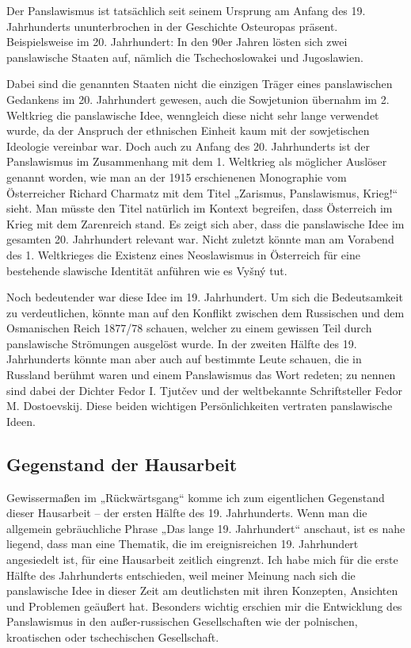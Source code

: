 \documentclass[12pt,headsepline,a4paper]{scrartcl}
\begin{document}
Der Panslawismus ist tatsächlich seit seinem Ursprung am Anfang des 19. Jahrhunderts
ununterbrochen in der Geschichte Osteuropas präsent. Beispielsweise im 20. Jahrhundert:
In den 90er Jahren lösten sich zwei panslawische Staaten auf, nämlich die Tschechoslowakei
und Jugoslawien.

Dabei sind die genannten Staaten nicht die einzigen Träger eines panslawischen Gedankens
im 20. Jahrhundert gewesen, auch die Sowjetunion übernahm im 2. Weltkrieg die
panslawische Idee, wenngleich diese nicht sehr lange verwendet wurde, da der Anspruch der
ethnischen Einheit kaum mit der sowjetischen Ideologie vereinbar war.\autocite[9]{troebst}
Doch auch zu Anfang des 20. Jahrhunderts ist der Panslawismus im Zusammenhang mit dem
1. Weltkrieg als möglicher Auslöser genannt worden, wie man an der 1915 erschienenen
Monographie vom Österreicher Richard Charmatz mit dem Titel „Zarismus, Panslawismus,
Krieg!“ sieht. Man müsste den Titel natürlich im Kontext begreifen, dass Österreich im Krieg
mit dem Zarenreich stand. Es zeigt sich aber, dass die panslawische Idee im gesamten 20.
Jahrhundert relevant war. Nicht zuletzt könnte man am Vorabend des 1. Weltkrieges die
Existenz eines Neoslawismus in Österreich für eine bestehende slawische Identität anführen
wie es Vyšný\autocite{vyshny} tut.

Noch bedeutender war diese Idee im 19. Jahrhundert. Um sich die Bedeutsamkeit zu
verdeutlichen, könnte man auf den Konflikt zwischen dem Russischen und dem Osmanischen
Reich 1877/78 schauen, welcher zu einem gewissen Teil durch panslawische Strömungen
ausgelöst wurde. In der zweiten Hälfte des 19. Jahrhunderts könnte man aber auch auf
bestimmte Leute schauen, die in Russland berühmt waren und einem Panslawismus das Wort
redeten; zu nennen sind dabei der Dichter Fedor I. Tjutčev und der weltbekannte Schriftsteller
Fedor M. Dostoevskij. Diese beiden wichtigen Persönlichkeiten vertraten panslawische Ideen.

\subsection*{Gegenstand der Hausarbeit}
Gewissermaßen im „Rückwärtsgang“ komme ich zum eigentlichen Gegenstand dieser
Hausarbeit – der ersten Hälfte des 19. Jahrhunderts. Wenn man die allgemein gebräuchliche
Phrase „Das lange 19. Jahrhundert“ anschaut, ist es nahe liegend, dass man eine Thematik, die
im ereignisreichen 19. Jahrhundert angesiedelt ist, für eine Hausarbeit zeitlich eingrenzt. Ich
habe mich für die erste Hälfte des Jahrhunderts entschieden, weil meiner Meinung nach sich
die panslawische Idee in dieser Zeit am deutlichsten mit ihren Konzepten, Ansichten und
Problemen geäußert hat. Besonders wichtig erschien mir die Entwicklung des Panslawismus
in den außer-russischen Gesellschaften wie der polnischen, kroatischen oder tschechischen
Gesellschaft.
\end{document}

